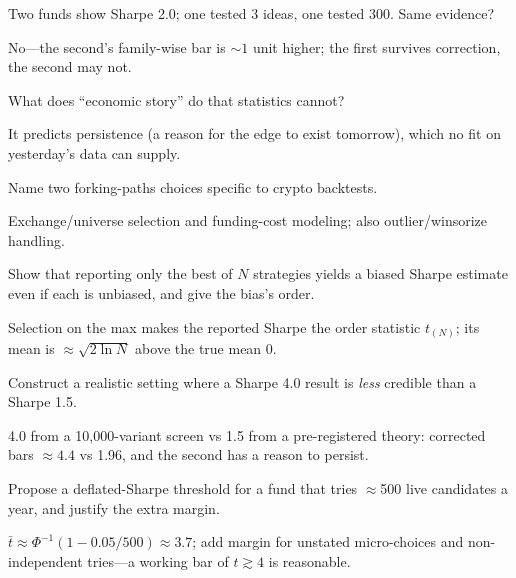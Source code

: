 \begin{exercise}
Two funds show Sharpe 2.0; one tested 3 ideas, one tested 300. Same evidence?
\end{exercise}
\begin{solution}
No---the second's family-wise bar is $\sim1$ unit higher; the first survives correction,
the second may not.
\end{solution}

\begin{exercise}
What does ``economic story'' do that statistics cannot?
\end{exercise}
\begin{solution}
It predicts persistence (a reason for the edge to exist tomorrow), which no fit on
yesterday's data can supply.
\end{solution}

\begin{exercise}
Name two forking-paths choices specific to crypto backtests.
\end{exercise}
\begin{solution}
Exchange/universe selection and funding-cost modeling; also outlier/winsorize handling.
\end{solution}

\begin{exercise}[hard]
Show that reporting only the best of $N$ strategies yields a biased Sharpe estimate even
if each is unbiased, and give the bias's order.
\end{exercise}
\begin{solution}
Selection on the max makes the reported Sharpe the order statistic $t_{(N)}$; its mean is
$\approx\sqrt{2\ln N}$ above the true mean 0.
\end{solution}

\begin{exercise}[hard]
Construct a realistic setting where a Sharpe 4.0 result is \emph{less} credible than a
Sharpe 1.5.
\end{exercise}
\begin{solution}
4.0 from a 10{,}000-variant screen vs 1.5 from a pre-registered theory: corrected bars
$\approx4.4$ vs 1.96, and the second has a reason to persist.
\end{solution}

\begin{exercise}[hard]
Propose a deflated-Sharpe threshold for a fund that tries $\approx$500 live candidates
a year, and justify the extra margin.
\end{exercise}
\begin{solution}
$\bar t\approx\Phi^{-1}(1-0.05/500)\approx3.7$; add margin for unstated micro-choices and
non-independent tries---a working bar of $t\gtrsim4$ is reasonable.
\end{solution}

